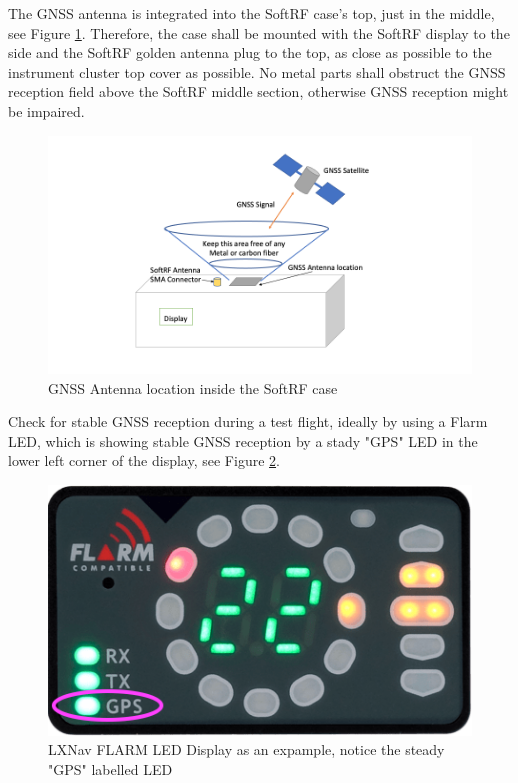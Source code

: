 \documentclass[11pt,a4paper]{article}
\begin{document}
The GNSS antenna is integrated into the SoftRF case's top, just in the middle, see Figure \ref{fig_gnss_ant}. Therefore, the case shall be mounted with the SoftRF display to the side and the SoftRF golden antenna plug to the top, as close as possible to the instrument cluster top cover as possible. No metal parts shall obstruct the GNSS reception field above the SoftRF middle section, otherwise GNSS reception might be impaired. 

\begin{figure}[h]
\centering
\includegraphics[scale=.5]{gnss_antenna.png}
\caption{GNSS Antenna location inside the SoftRF case}\label{fig_gnss_ant}
\end{figure}

Check for stable  GNSS reception during a test flight, ideally by using a Flarm LED, which is showing stable GNSS reception by a stady "GPS" LED in the lower left corner of the display, see Figure \ref{flarm_led}.

\begin{figure}[h]
\centering
\includegraphics[scale=.4]{lxnav_flarm_led_display.png}
\caption{LXNav FLARM LED Display as an expample, notice the steady "GPS" labelled LED}\label{flarm_led}
\end{figure}
\end{document}
